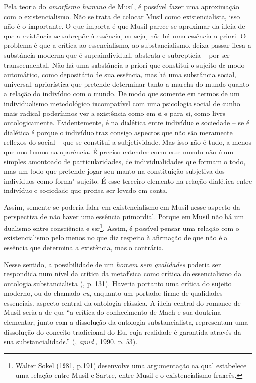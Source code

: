 Pela teoria do \emph{amorfismo humano} de Musil, é possível fazer uma
aproximação com o existencialismo. Não se trata de colocar Musil como
existencialista, isso não é o importante. O que importa é que Musil
parece se aproximar da ideia de que a existência se sobrepõe à essência,
ou seja, não há uma essência a priori. O problema é que a crítica ao
essencialismo, ao substancialismo, deixa passar ilesa a substância
moderna que é supraindividual, abstrata e subreptícia -- por ser
transcendental. Não há uma substância a priori que constitui o sujeito
de modo automático, como depositário de sua essência, mas há uma
substância social, universal, apriorística que pretende determinar tanto
a marcha do mundo quanto a relação do indivíduo com o mundo. De modo que
somente em termos de um individualismo metodológico incompatível com uma
psicologia social de cunho mais radical poderíamos ver a existência como
em si e para si, como livre ontologicamente. Evidentemente, é na
dialética entre indivíduo e sociedade -- se é dialética é porque o
indivíduo traz consigo aspectos que não são meramente reflexos do social
-- que se constitui a subjetividade. Mas isso não é tudo, a menos que
nos fiemos na aparência. É preciso entender como esse mundo não é um
simples amontoado de particularidades, de individualidades que formam o
todo, mas um todo que pretende jogar seu manto na constituição subjetiva
dos indivíduos como forma"-sujeito. É esse terceiro elemento na relação
dialética entre indivíduo e sociedade que precisa ser levado em conta.

Assim, somente se poderia falar em existencialismo em Musil nesse
aspecto da perspectiva de não haver uma essência primordial. Porque em
Musil não há um dualismo entre consciência e ser\footnote{Walter Sokel
  (1981, p.191) desenvolve uma argumentação na qual estabelece uma
  relação entre Musil e Sartre, entre Musil e o existencialismo francês.}.
Assim, é possível pensar uma relação com o existencialismo pelo menos no
que diz respeito à afirmação de que não é a essência que determina a
existência, mas o contrário.

Nesse sentido, a possibilidade de um \emph{homem sem qualidades} poderia
ser respondida num nível da crítica da metafísica como crítica do
essencialismo da ontologia substancialista (, p. 131). Haveria
portanto uma crítica do sujeito moderno, ou do chamado \emph{eu},
enquanto um portador firme de qualidades essenciais, aspecto central da
ontologia clássica. A ideia central do romance de Musil seria a de que
``a crítica do conhecimento de Mach e sua doutrina elementar, junto com
a dissolução da ontologia substancialista, representam uma dissolução do
conceito tradicional do Eu, cuja realidade é garantida através da sua
substancialidade.'' (, \emph{apud} , 1990, p. 53).

